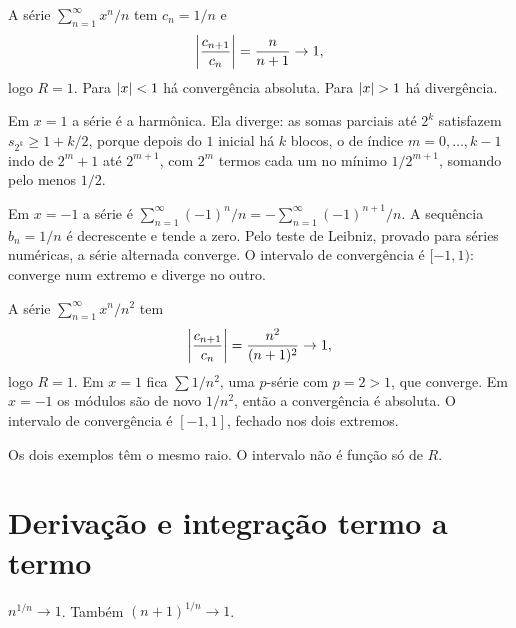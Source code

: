 \documentclass[11pt,a4paper]{article}
\begin{document}
\begin{exemplo}
\label{ex:xn-sobre-n}
A série \(\sum_{n=1}^\infty x^n/n\) tem \(c_n=1/n\) e
\[
\left\lvert \frac{c_{n+1}}{c_n} \right\rvert=\frac{n}{n+1}\to 1,
\]
logo \(R=1\). Para \(\left\lvert x \right\rvert<1\) há convergência absoluta. Para \(\left\lvert x \right\rvert>1\) há divergência.

Em \(x=1\) a série é a harmônica. Ela diverge: as somas parciais até \(2^k\) satisfazem \(s_{2^k}\ge 1+k/2\), porque depois do \(1\) inicial há \(k\) blocos, o de índice \(m=0,\ldots,k-1\) indo de \(2^m+1\) até \(2^{m+1}\), com \(2^m\) termos cada um no mínimo \(1/2^{m+1}\), somando pelo menos \(1/2\).

Em \(x=-1\) a série é \(\sum_{n=1}^\infty (-1)^n/n=-\sum_{n=1}^\infty (-1)^{n+1}/n\). A sequência \(b_n=1/n\) é decrescente e tende a zero. Pelo teste de Leibniz, provado para séries numéricas, a série alternada converge. O intervalo de convergência é \([-1,1)\): converge num extremo e diverge no outro.
\end{exemplo}

\begin{exemplo}
\label{ex:xn-sobre-n2}
A série \(\sum_{n=1}^\infty x^n/n^2\) tem
\[
\left\lvert \frac{c_{n+1}}{c_n} \right\rvert=\frac{n^2}{(n+1)^2}\to 1,
\]
logo \(R=1\). Em \(x=1\) fica \(\sum 1/n^2\), uma \(p\)-série com \(p=2>1\), que converge. Em \(x=-1\) os módulos são de novo \(1/n^2\), então a convergência é absoluta. O intervalo de convergência é \([-1,1]\), fechado nos dois extremos.

Os dois exemplos têm o mesmo raio. O intervalo não é função só de \(R\).
\end{exemplo}

\section{Derivação e integração termo a termo}

\begin{lema}
\label{lem:n-raiz}
\(n^{1/n}\to 1\). Também \((n+1)^{1/n}\to 1\).
\end{lema}
\end{document}
